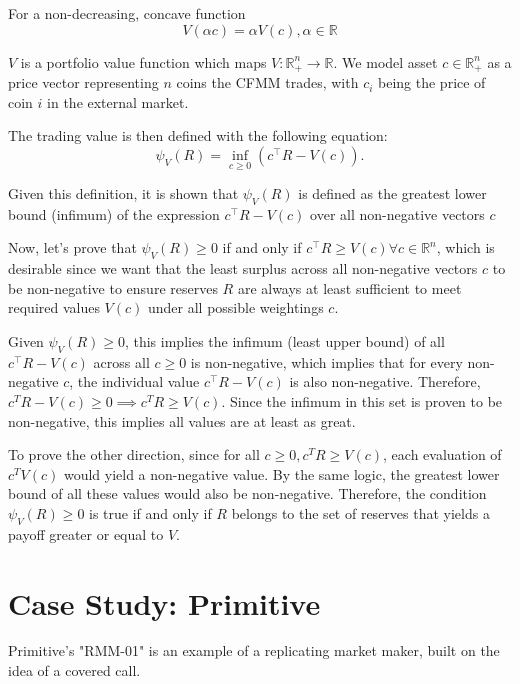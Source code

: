 \documentclass[12pt]{article}
\begin{document}
    For a non-decreasing, concave function
    \[V(\alpha c) = \alpha V(c), \alpha\in\mathbb{R}
        \]
    
    \(V\) is a portfolio value function which maps \(V: \mathbb{R}^n_+ \to \mathbb{R}\). We model asset \(c \in \mathbb{R}^n_+\) as a price vector representing \(n\) coins the CFMM trades, with \(c_i\) being the price of coin \(i\) in the external market. 

    The trading value is then defined with the following equation:
    \[
        \psi_V\left(R\right) = \inf_{c\geq0}(c^{\intercal}R - V\left(c\right)).\]
    
    Given this definition, it is shown that \(\psi_V\left(R\right)\) is defined as the greatest lower bound (infimum) of the expression \(c^{\intercal}R - V\left(c\right) \) over all non-negative vectors \(c\)

    Now, let's prove that \(\psi_V\left(R\right) \geq 0\) if and only if \(c^{\intercal}R \geq V(c) \forall c \in \mathbb{R}^n\), which is desirable since we want that the least surplus across all non-negative vectors \(c\) to be non-negative to ensure reserves \(R\) are always at least sufficient to meet required values \(V(c)\) under all possible weightings \(c\).

    Given \(\psi_V\left(R\right) \geq 0\), this implies the infimum (least upper bound) of all \(c^{\intercal}R - V\left(c\right)\) across all \(c \geq 0\) is non-negative, which implies that for every non-negative \(c\), the individual value \(c^{\intercal}R - V\left(c\right)\) is also non-negative. Therefore, \(c^TR-V(c) \geq 0 \implies c^TR \geq V(c)\). Since the infimum in this set is proven to be non-negative, this implies all values are at least as great.

    To prove the other direction, since for all \(c \geq 0, c^TR \geq V(c)\), each evaluation of \(c^TV(c)\) would yield a non-negative value. By the same logic, the greatest lower bound of all these values would also be non-negative. Therefore, the condition \(\psi_V\left(R\right) \geq 0\) is true if and only if \(R\) belongs to the set of reserves that yields a payoff greater or equal to \(V\).

\section{Case Study: Primitive}
Primitive's "RMM-01" is an example of a replicating market maker, built on the idea of a covered call.
\end{document}
